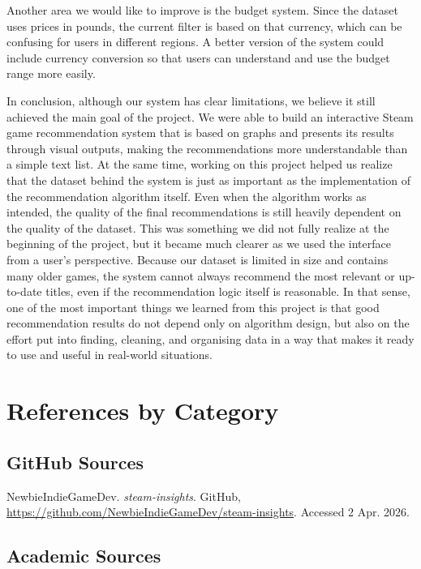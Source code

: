 \documentclass[fontsize=11pt]{article}
\begin{document}
Another area we would like to improve is the budget system. Since the dataset uses prices in pounds, the current filter is based on that currency, which can be confusing for users in different regions. A better version of the system could include currency conversion so that users can understand and use the budget range more easily.

In conclusion, although our system has clear limitations, we believe it still achieved the main goal of the project. We were able to build an interactive Steam game recommendation system that is based on graphs and presents its results through visual outputs, making the recommendations more understandable than a simple text list. At the same time, working on this project helped us realize that the dataset behind the system is just as important as the implementation of the recommendation algorithm itself. Even when the algorithm works as intended, the quality of the final recommendations is still heavily dependent on the quality of the dataset. This was something we did not fully realize at the beginning of the project, but it became much clearer as we used the interface from a user’s perspective. Because our dataset is limited in size and contains many older games, the system cannot always recommend the most relevant or up-to-date titles, even if the recommendation logic itself is reasonable. In that sense, one of the most important things we learned from this project is that good recommendation results do not depend only on algorithm design, but also on the effort put into finding, cleaning, and organising data in a way that makes it ready to use and useful in real-world situations.

\newpage

\section*{References by Category}

\subsection*{GitHub Sources}

\noindent
NewbieIndieGameDev. \textit{steam-insights}. GitHub, \\\url{https://github.com/NewbieIndieGameDev/steam-insights}. Accessed 2 Apr. 2026.

\bigskip

\subsection*{Academic Sources}
\end{document}
